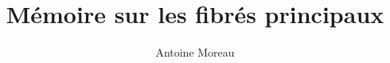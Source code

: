 \documentclass[a4paper,10pt]{article}
\title{M\'emoire sur les fibr\'es principaux}
\author{Antoine Moreau}
\begin{document}
\maketitle

\begin{abstract}

\end{abstract}







\end{document}
